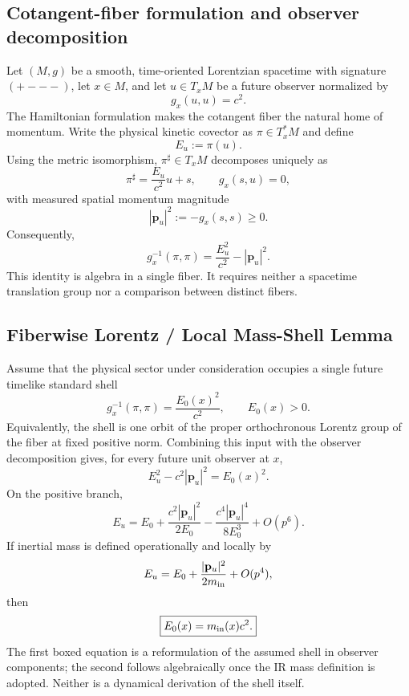 \documentclass[11pt,a4paper]{article}
\begin{document}
\subsection{Cotangent-fiber formulation and observer decomposition}
Let $(M,g)$ be a smooth, time-oriented Lorentzian spacetime with signature $(+---)$, let $x\in M$, and let $u\in T_xM$ be a future observer normalized by
\begin{equation}
 g_x(u,u)=c^2.
\end{equation}
The Hamiltonian formulation makes the cotangent fiber the natural home of momentum.  Write the physical kinetic covector as $\pi\in T_x^*M$ and define
\begin{equation}
 E_u:=\pi(u).
\end{equation}
Using the metric isomorphism, $\pi^\sharp\in T_xM$ decomposes uniquely as
\begin{equation}
 \pi^\sharp=\frac{E_u}{c^2}u+s,
 \qquad g_x(s,u)=0,
\end{equation}
with measured spatial momentum magnitude
\begin{equation}
 |\mathbf p_u|^2:=-g_x(s,s)\ge0.
\end{equation}
Consequently,
\begin{equation}
 \boxed{g_x^{-1}(\pi,\pi)=\frac{E_u^2}{c^2}-|\mathbf p_u|^2.}
\end{equation}
This identity is algebra in a single fiber.  It requires neither a spacetime translation group nor a comparison between distinct fibers.

\subsection{Fiberwise Lorentz / Local Mass-Shell Lemma}
Assume that the physical sector under consideration occupies a single future timelike standard shell
\begin{equation}
 \boxed{g_x^{-1}(\pi,\pi)=\frac{E_0(x)^2}{c^2}},
 \qquad E_0(x)>0.
\end{equation}
Equivalently, the shell is one orbit of the proper orthochronous Lorentz group of the fiber at fixed positive norm.  Combining this input with the observer decomposition gives, for every future unit observer at $x$,
\begin{equation}
 \boxed{E_u^2-c^2|\mathbf p_u|^2=E_0(x)^2.}
\end{equation}
On the positive branch,
\begin{equation}
 E_u=E_0+\frac{c^2|\mathbf p_u|^2}{2E_0}
      -\frac{c^4|\mathbf p_u|^4}{8E_0^3}+O(p^6).
\end{equation}
If inertial mass is defined operationally and locally by
\begin{equation}
 E_u=E_0+\frac{|\mathbf p_u|^2}{2m_{\rm in}}+O(p^4),
\end{equation}
then
\begin{equation}
 \boxed{E_0(x)=m_{\rm in}(x)c^2.}
\end{equation}
The first boxed equation is a reformulation of the assumed shell in observer components; the second follows algebraically once the IR mass definition is adopted.  Neither is a dynamical derivation of the shell itself.
\end{document}

